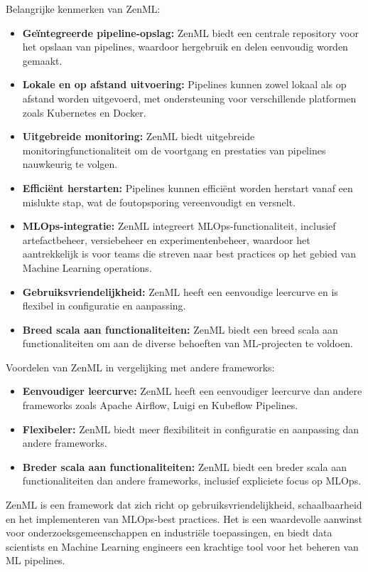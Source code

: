 Belangrijke kenmerken van ZenML:
\begin{itemize}
    \item \textbf{Geïntegreerde pipeline-opslag:} ZenML biedt een centrale repository voor het opslaan van pipelines, waardoor hergebruik en delen eenvoudig worden gemaakt.
    \item \textbf{Lokale en op afstand uitvoering:} Pipelines kunnen zowel lokaal als op afstand worden uitgevoerd, met ondersteuning voor verschillende platformen zoals Kubernetes en Docker.
    \item \textbf{Uitgebreide monitoring:} ZenML biedt uitgebreide monitoringfunctionaliteit om de voortgang en prestaties van pipelines nauwkeurig te volgen.
    \item \textbf{Efficiënt herstarten:} Pipelines kunnen efficiënt worden herstart vanaf een mislukte stap, wat de foutopsporing vereenvoudigt en versnelt.
    \item \textbf{MLOps-integratie:} ZenML integreert MLOps-functionaliteit, inclusief artefactbeheer, versiebeheer en experimentenbeheer, waardoor het aantrekkelijk is voor teams die streven naar best practices op het gebied van Machine Learning operations.
    \item \textbf{Gebruiksvriendelijkheid:} ZenML heeft een eenvoudige leercurve en is flexibel in configuratie en aanpassing.
    \item \textbf{Breed scala aan functionaliteiten:} ZenML biedt een breed scala aan functionaliteiten om aan de diverse behoeften van ML-projecten te voldoen.
\end{itemize}

Voordelen van ZenML in vergelijking met andere frameworks:
\begin{itemize}
    \item \textbf{Eenvoudiger leercurve:} ZenML heeft een eenvoudiger leercurve dan andere frameworks zoals Apache Airflow, Luigi en Kubeflow Pipelines.
    \item \textbf{Flexibeler:} ZenML biedt meer flexibiliteit in configuratie en aanpassing dan andere frameworks.
    \item \textbf{Breder scala aan functionaliteiten:} ZenML biedt een breder scala aan functionaliteiten dan andere frameworks, inclusief expliciete focus op MLOps.
\end{itemize}
ZenML is een framework dat zich richt op gebruiksvriendelijkheid, schaalbaarheid en het implementeren van MLOps-best practices. Het is een waardevolle aanwinst voor onderzoeksgemeenschappen en industriële toepassingen, en biedt data scientists en Machine Learning engineers een krachtige tool voor het beheren van ML pipelines.


